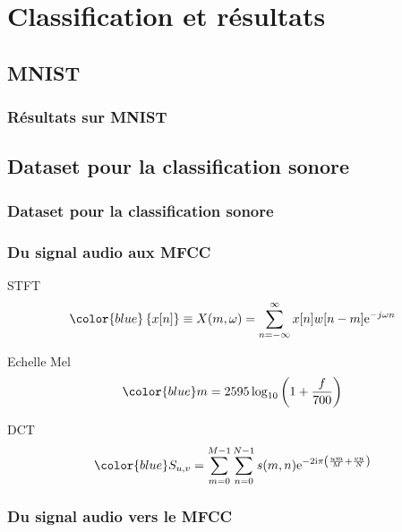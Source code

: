 \documentclass[aspectratio=169]{beamer}
\begin{document}
\section{Classification et résultats}

\subsection{MNIST}

\begin{frame}
  \frametitle{Résultats sur MNIST}


\end{frame}

\subsection{Dataset pour la classification sonore}

\begin{frame}
  \frametitle{Dataset pour la classification sonore}

\end{frame}

\begin{frame}
  \frametitle{Du signal audio aux MFCC}
  \scriptsize{ %

  \begin{block}{\color{gray} STFT}
    \[
    \color{blue} \left\{ x[ n ] \right\} \equiv X(m,\omega) = \sum_{n=-\infty}^{\infty} x[n]w[n-m]\mathrm{e}^{-j \omega n}
    \]
  \end{block}

  \vspace{0.5em} %

  \begin{block}{\color{gray} Echelle Mel}
    \[
    \color{blue} m = 2595 \log_{10}\left(1 + \frac{f}{700}\right)
    \]
  \end{block}

  \vspace{0.5em} %

  \begin{block}{\color{gray} DCT}
    \[
    \color{blue} S_{u,v} = \sum_{m = 0}^{M- 1} \sum_{n = 0}^{N- 1} s(m, n)\mathrm e^{-2\mathrm i\pi \left ( \frac{um}M+ \frac{vn}N\right )}
    \]
  \end{block}
  } %
\end{frame}
\begin{frame}
  \frametitle{Du signal audio vers le MFCC}

  

\end{frame}
\end{document}
